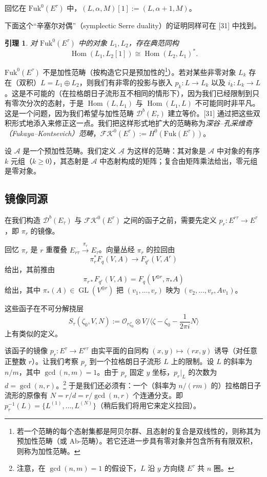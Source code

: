 \documentclass[11pt,a4paper]{article}
\theoremstyle{plain}
\newtheorem{lemma}[theorem]{引理}
\theoremstyle{definition}
\begin{document}
回忆在 $\mathrm{Fuk}^0(E^\tau)$ 中，$(L,\alpha,M)[1]:=(L,\alpha+1,M)$。

下面这个“辛塞尔对偶”（symplectic Serre duality）的证明同样可在 [31] 中找到。

\begin{lemma}
对 $\mathrm{Fuk}^0(E^\tau)$ 中的对象 $L_1,L_2$，存在典范同构
\[
\operatorname{Hom}(L_1,L_2[1])\cong\operatorname{Hom}(L_2,L_1)^{*}.
\]
\end{lemma}

$\mathrm{Fuk}^0(E^\tau)$ 不是加性范畴（按构造它只是预加性的\footnote{若一个范畴的每个态射集都是阿贝尔群、且态射的复合是双线性的，则称其为预加性范畴（或 Ab-范畴）。若它还进一步具有零对象并包含所有有限双积，则称为加性范畴。}）。若对某些非零对象 $L_k$ 存在（双积）$L=L_1\oplus L_2$，则我们有非零的投影与嵌入 $p_k:L\to L_k$ 以及 $i_k:L_k\to L$。这是不可能的（在拉格朗日子流形互不相同的情形下），因为我们已经限制到只有零次分次的态射，于是 $\operatorname{Hom}(L,L_1)$ 与 $\operatorname{Hom}(L_1,L)$ 不可能同时非平凡。这是一个问题，因为我们希望与加性范畴 $\mathcal{D}^b(E_\tau)$ 建立等价。[31] 通过把这些双积形式地添入来修正这一点。我们把这样形式地扩大的范畴称为\textit{深谷–孔采维奇（Fukaya–Kontsevich）范畴}，$\mathcal{FK}^0(E^\tau):=H^0(\mathrm{Fuk}(E^\tau))$。

设 $\mathcal{A}$ 是一个预加性范畴。我们定义 $\underline{\mathcal{A}}$ 为这样的范畴：其对象是 $\mathcal{A}$ 中对象的有序 $k$ 元组（$k\ge 0$），其态射是 $\mathcal{A}$ 中态射构成的矩阵；复合由矩阵乘法给出，零元组是零对象。

\subsection{镜像同源}

在我们构造 $\mathcal{D}^b(E_\tau)$ 与 $\mathcal{FK}^0(E^\tau)$ 之间的函子之前，需要先定义 $p_r:E^{r\tau}\to E^\tau$，即 $\pi_r$ 的镜像。

回忆 $\pi_r$ 是 $r$ 重覆叠 $E_{r\tau}\xrightarrow{\pi_r}E_\tau$。向量丛经 $\pi_r$ 的拉回由
\[
\pi_r^{*}F_q(V,A)\to F_{q^{r}}(V,A^{r})
\]
给出，其前推由
\[
\pi_{r*}F_{q^{r}}(V,A)=F_q(V^{\oplus r},\pi_*A)
\]
给出，其中 $\pi_*(A)\in\operatorname{GL}(V^{\oplus r})$ 把 $(v_1,\dots,v_r)$ 映为 $(v_2,\dots,v_r,Av_1)$。

这些函子在不可分解挠层
\[
S_\tau(\zeta_0,V,N):=\mathcal{O}_{r\zeta_0}\otimes V\Big/\Big\langle \zeta-\zeta_0-\frac{1}{2\pi i}N\Big\rangle
\]
上有类似的定义。

该函子的镜像 $p_r:E^\tau\to E^{r\tau}$ 由实平面的自同构 $(x,y)\mapsto(rx,y)$ 诱导（对任意正整数 $r$）。让我们考察 $p_r$ 到一个拉格朗日子流形 $L$ 上的限制。设 $L$ 的斜率为 $n/m$，其中 $\gcd(n,m)=1$。由于 $p_r$ 固定 $y$ 坐标，$p_r|_L$ 的次数为 $d=\gcd(n,r)$。\footnote{注意，在 $\gcd(n,m)=1$ 的假设下，$L$ 沿 $y$ 方向绕 $E^\tau$ 共 $n$ 圈。} 于是我们还必须有：一个（斜率为 $n/(rm)$ 的）拉格朗日子流形的原像有 $N=r/d=r/\gcd(n,r)$ 个连通分支。即 $p_r^{-1}(L)=\{L^{(1)},\dots,L^{(N)}\}$（稍后我们将用它来定义拉回）。
\end{document}
